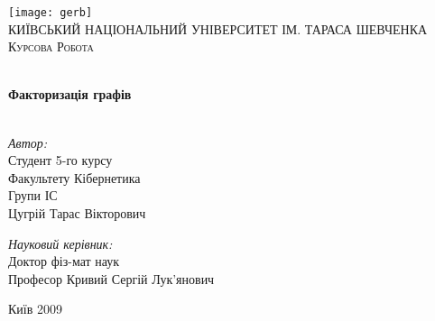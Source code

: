 \begin{titlepage}
  \begin{center}
    
    \texttt{[image: gerb]}\\[1cm]
    
    \textsc{\LARGE КИЇВСЬКИЙ НАЦІОНАЛЬНИЙ УНІВЕРСИТЕТ ІМ. ТАРАСА ШЕВЧЕНКА}\\[1.5cm]
    \textsc{\Large Курсова Робота}

    \HRule \\[0.4cm]
           { \huge \bfseries Факторизація графів}\\[0.4cm]
           
           \HRule \\[1.5cm]
           
           \begin{minipage}{0.45\textwidth}
             \begin{flushleft} \large
               \emph{Автор:}\\
               Студент 5-го курсу\\
               Факультету Кібернетика\\
               Групи ІС\\
               {Ц}угрій {Т}арас {В}ікторович 
             \end{flushleft}
           \end{minipage}
           \begin{minipage}{0.5\textwidth}
             \begin{flushright} \large
               \emph{Науковий керівник:}\\
               Доктор фіз-мат наук\\
               Професор {К}ривий {С}ергій {Л}ук'янович
             \end{flushright}
           \end{minipage}
           
           \vfill
           
           {\large Київ 2009}
           
  \end{center}
  
\end{titlepage}
